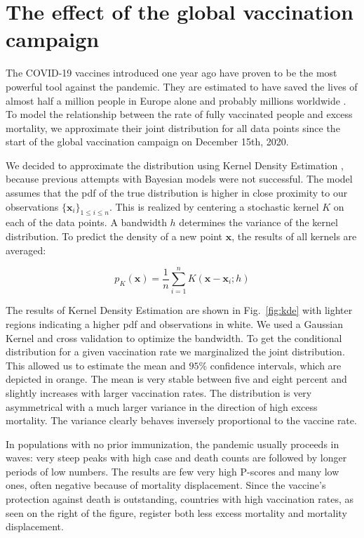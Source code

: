 \documentclass{article}
\newcommand{\figref}[1]{Fig.~\ref{#1}}
\begin{document}
\section{The effect of the global vaccination campaign}

The COVID-19 vaccines introduced one year ago have proven to be the most powerful tool against the pandemic. They are estimated to have saved the lives of almost half a million people in Europe alone and probably millions worldwide \citep{mesle21}. To model the relationship between the rate of fully vaccinated people and excess mortality, we approximate their joint distribution for all data points since the start of the global vaccination campaign on December 15th, 2020.

We decided to approximate the distribution using Kernel Density Estimation \citep{parzen62}, because previous attempts with Bayesian models were not successful. The model assumes that the pdf of the true distribution is higher in close proximity to our observations $\{\mathbf{x}_i\}_{1\leq i \leq n}$. This is realized by centering a stochastic kernel $K$ on each of the data points. A bandwidth $h$ determines the variance of the kernel distribution. To predict the density of a new point $\mathbf{x}$, the results of all kernels are averaged:

\begin{equation}
	p_K(\mathbf{x}) = \frac{1}{n} \sum_{i=1}^{n} K\left(\mathbf{x} - \mathbf{x}_i; h \right)
\end{equation}

The results of Kernel Density Estimation are shown in \figref{fig:kde} with lighter regions indicating a higher pdf and observations in white. We used a Gaussian Kernel and cross validation to optimize the bandwidth. To get the conditional distribution for a given vaccination rate we marginalized the joint distribution. This allowed us to estimate the mean and $95\%$ confidence intervals, which are depicted in orange. The mean is very stable between five and eight percent and slightly increases with larger vaccination rates. The distribution is very asymmetrical with a much larger variance in the direction of high excess mortality. The variance clearly behaves inversely proportional to the vaccine rate.

In populations with no prior immunization, the pandemic usually proceeds in waves: very steep peaks with high case and death counts are followed by longer periods of low numbers. The results are few very high P-scores and many low ones, often negative because of mortality displacement. Since the vaccine's protection against death is outstanding, countries with high vaccination rates, as seen on the right of the figure, register both less excess mortality and mortality displacement.
\end{document}
